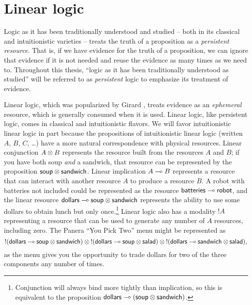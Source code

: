 
\chapter{Linear logic}

Logic as it has been traditionally understood and studied -- both in
its classical and intuitionistic varieties -- treats the truth of a
proposition as a {\it persistent resource}. That is, if we have
evidence for the truth of a proposition, we can ignore that evidence
if it is not needed and reuse the evidence as many times as we need
to. Throughout this thesis, ``logic as it has been traditionally
understood as studied'' will be referred to as {\it persistent} logic
to emphasize its treatment of evidence. 

Linear logic, which was popularized by Girard \cite{girard87linear},
treats evidence as an {\it ephemeral} resource, which is generally
consumed when it is used. Linear logic, like persistent logic, comes
in classical and intuitionistic flavors. We will favor intuitionistic
linear logic in part because the propositions of intuitionistic
linear logic (written $A$, $B$, $C$, \ldots) have a more natural
correspondence with physical resources. Linear conjunction $A \otimes
B$ represents the resource built from the resources $A$ and $B$; if
you have both soup {\it and} a sandwich, that resource can be
represented by the proposition ${\sf soup} \otimes {\sf
  sandwich}$. Linear implication $A \multimap B$ represents a resource
that can interact with another resource $A$ to produce a resource
$B$. A robot with batteries not included could be represented as the
resource ${\sf batteries} \multimap {\sf robot}$, and the linear resource
${\sf dollars} \multimap {\sf soup} \otimes {\sf sandwich}$ represents
the ability to use some dollars to obtain lunch but only
once.\footnote{Conjunction will always bind more tightly than
  implication, so this is equivalent to the proposition ${\sf dollars}
  \multimap ({\sf soup} \otimes {\sf sandwich})$.} Linear logic also has
a modality ${!}A$ representing a resource that can be used to generate
any number of $A$ resources, including zero. The Panera ``You Pick
Two'' menu might be represented as
\[ {!}({\sf dollars} \multimap {\sf soup} \otimes {\sf sandwich}) \otimes
{!}({\sf dollars} \multimap {\sf soup} \otimes {\sf salad}) \otimes
{!}({\sf dollars} \multimap {\sf sandwich} \otimes {\sf salad}),\] as the
menu gives you the opportunity to trade dollars for two of the three
components any number of times.






